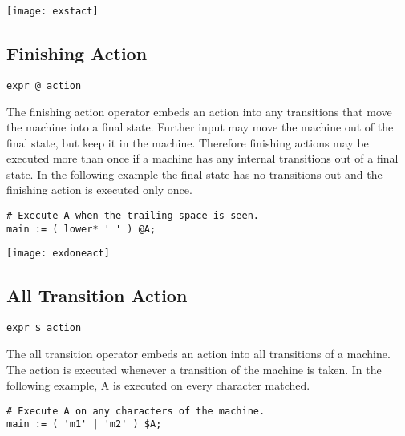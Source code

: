 \documentclass[letterpaper,11pt,oneside]{book}
\newcommand{\verbspace}{\vspace{10pt}}
\newcommand{\graphspace}{\vspace{10pt}}
\newenvironment{inline_code}{\def\baselinestretch{1}\vspace{12pt}\small}{}
\begin{document}
\graphspace
\begin{center}
\texttt{[image: exstact]}
\end{center}
\graphspace

\subsection{Finishing Action}

\verb|expr @ action|
\verbspace

The finishing action operator embeds an action into any transitions that move
the machine into a final state. Further input may move the machine out of the
final state, but keep it in the machine. Therefore finishing actions may be
executed more than once if a machine has any internal transitions out of a
final state. In the following example the final state has no transitions out
and the finishing action is executed only once.

\begin{inline_code}
\begin{verbatim}
# Execute A when the trailing space is seen.
main := ( lower* ' ' ) @A;
\end{verbatim}
\end{inline_code}

\graphspace
\begin{center}
\texttt{[image: exdoneact]}
\end{center}
\graphspace

\subsection{All Transition Action}

\verb|expr $ action|
\verbspace

The all transition operator embeds an action into all transitions of a machine.
The action is executed whenever a transition of the machine is taken. In the
following example, A is executed on every character matched.

\begin{inline_code}
\begin{verbatim}
# Execute A on any characters of the machine.
main := ( 'm1' | 'm2' ) $A;
\end{verbatim}
\end{inline_code}
\end{document}
